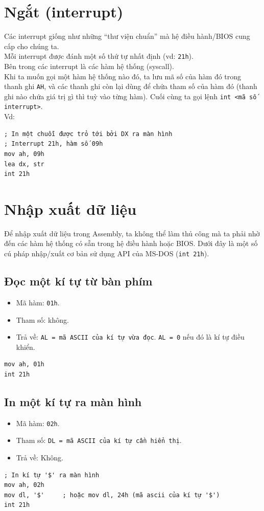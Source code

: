 \documentclass[12pt]{report}
\newcommand{\code}[1]{\texttt{#1}}
\begin{document}
\section{Ngắt (interrupt)}
Các interrupt giống như những ``thư viện chuẩn'' mà hệ điều hành/BIOS cung cấp cho chúng ta. \\
Mỗi interrupt được đánh một số thứ tự nhất định (vd: \code{21h}).\\
Bên trong các interrupt là các hàm hệ thống (syscall).\\
Khi ta muốn gọi một hàm hệ thống nào đó, ta lưu mã số của hàm đó trong thanh ghi \code{AH}, và các thanh ghi còn lại dùng để chứa tham số của hàm đó (thanh ghi nào chứa giá trị gì thì tuỳ vào từng hàm). Cuối cùng ta gọi lệnh \code{int <mã số interrupt>}.\\
Vd:
\begin{verbatim}
; In một chuỗi được trỏ tới bởi DX ra màn hình 
; Interrupt 21h, hàm số 09h
mov ah, 09h 
lea dx, str 
int 21h
\end{verbatim} 


\section{Nhập xuất dữ liệu}
Để nhập xuất dữ liệu trong Assembly, ta không thể làm thủ công mà ta phải nhờ đến các hàm hệ thống có sẵn trong hệ điều hành hoặc BIOS. Dưới đây là một số cú pháp nhập/xuất cơ bản sử dụng API của MS-DOS (\code{int 21h}).

\subsection*{Đọc một kí tự từ bàn phím}
\begin{itemize}
    \item Mã hàm: \code{01h}.
    \item Tham số: không.
    \item Trả về: \code{AL = mã ASCII của kí tự vừa đọc}. \code{AL = 0} nếu đó là kí tự điều khiển.
\end{itemize}
\begin{verbatim}
mov ah, 01h 
int 21h
\end{verbatim}

\subsection*{In một kí tự ra màn hình}
\begin{itemize}
    \item Mã hàm: \code{02h}.
    \item Tham số: \code{DL = mã ASCII của kí tự cần hiển thị}.
    \item Trả về: Không.
\end{itemize}
\begin{verbatim}
; In kí tự '$' ra màn hình 
mov ah, 02h 
mov dl, '$'     ; hoặc mov dl, 24h (mã ascii của kí tự '$')
int 21h
\end{verbatim}
\end{document}
